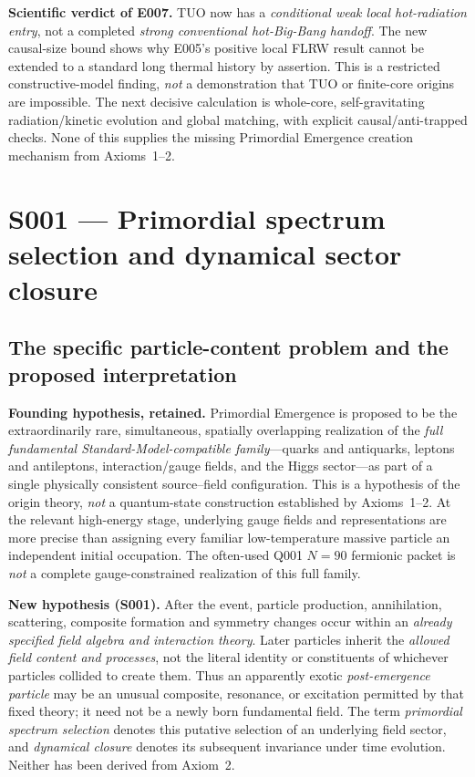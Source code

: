 \documentclass[11pt,a4paper]{article}
\theoremstyle{tmon}
\theoremstyle{definition}
\begin{document}
\begin{warningbox}
\textbf{Scientific verdict of E007.} TUO now has a \emph{conditional weak local hot-radiation entry}, not a completed \emph{strong conventional hot-Big-Bang handoff}. The new causal-size bound shows why E005's positive local FLRW result cannot be extended to a standard long thermal history by assertion. This is a restricted constructive-model finding, \emph{not} a demonstration that TUO or finite-core origins are impossible. The next decisive calculation is whole-core, self-gravitating radiation/kinetic evolution and global matching, with explicit causal/anti-trapped checks. None of this supplies the missing Primordial Emergence creation mechanism from Axioms~1--2.
\end{warningbox}



\clearpage
\section{S001 --- Primordial spectrum selection and dynamical sector closure}\label{sec:s001}
\subsection{The specific particle-content problem and the proposed interpretation}
\textbf{Founding hypothesis, retained.} Primordial Emergence is proposed to be the extraordinarily rare, simultaneous, spatially overlapping realization of the \emph{full fundamental Standard-Model-compatible family}---quarks and antiquarks, leptons and antileptons, interaction/gauge fields, and the Higgs sector---as part of a single physically consistent source--field configuration. This is a hypothesis of the origin theory, \emph{not} a quantum-state construction established by Axioms~1--2. At the relevant high-energy stage, underlying gauge fields and representations are more precise than assigning every familiar low-temperature massive particle an independent initial occupation. The often-used Q001 $N=90$ fermionic packet is \emph{not} a complete gauge-constrained realization of this full family.

\textbf{New hypothesis (S001).} After the event, particle production, annihilation, scattering, composite formation and symmetry changes occur within an \emph{already specified field algebra and interaction theory}. Later particles inherit the \emph{allowed field content and processes}, not the literal identity or constituents of whichever particles collided to create them. Thus an apparently exotic \emph{post-emergence particle} may be an unusual composite, resonance, or excitation permitted by that fixed theory; it need not be a newly born fundamental field. The term \emph{primordial spectrum selection} denotes this putative selection of an underlying field sector, and \emph{dynamical closure} denotes its subsequent invariance under time evolution. Neither has been derived from Axiom~2.
\end{document}
